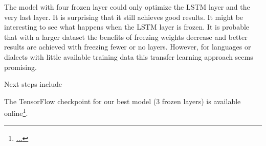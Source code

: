 \documentclass[12pt]{article}    %
\begin{document}
The model with four frozen layer could only optimize the LSTM layer and the very last layer. It is surprising that it still achieves good results. It might be interesting to see what happens when the LSTM layer is frozen. It is probable that with a larger dataset the benefits of freezing weights decrease and better results are achieved with freezing fewer or no layers. However, for languages or dialects with little available training data this transfer learning approach seems promising.

Next steps include

The TensorFlow checkpoint for our best model (3 frozen layers) is available online\footnote{\url{...}}.

\printbibliography
\end{document}
